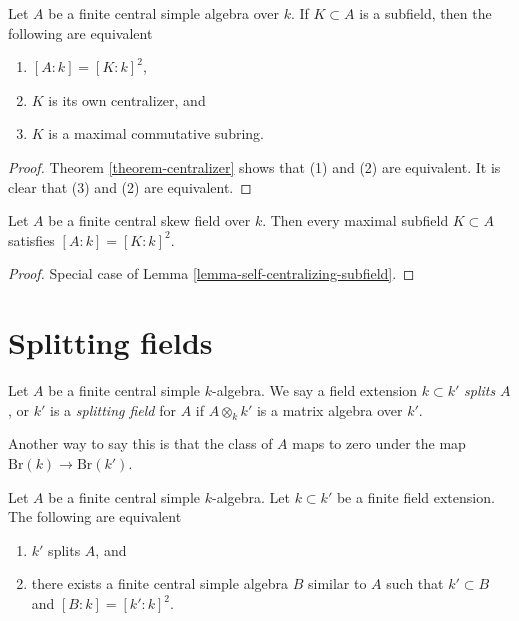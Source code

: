 \begin{lemma}
\label{lemma-self-centralizing-subfield}
Let $A$ be a finite central simple algebra over $k$.
If $K \subset A$ is a subfield, then the following are equivalent
\begin{enumerate}
\item $[A : k] = [K : k]^2$,
\item $K$ is its own centralizer, and
\item $K$ is a maximal commutative subring.
\end{enumerate}
\end{lemma}

\begin{proof}
Theorem \ref{theorem-centralizer}
shows that (1) and (2) are equivalent.
It is clear that (3) and (2) are equivalent.
\end{proof}

\begin{lemma}
\label{lemma-maximal-subfield}
Let $A$ be a finite central skew field over $k$.
Then every maximal subfield $K \subset A$ satisfies
$[A : k] = [K : k]^2$.
\end{lemma}

\begin{proof}
Special case of Lemma \ref{lemma-self-centralizing-subfield}.
\end{proof}





\section{Splitting fields}
\label{section-splitting}


\begin{definition}
\label{definition-splitting}
Let $A$ be a finite central simple $k$-algebra.
We say a field extension $k \subset k'$ {\it splits} $A$, or
$k'$ is a {\it splitting field} for $A$ if $A \otimes_k k'$ is
a matrix algebra over $k'$.
\end{definition}

\noindent
Another way to say this is that the class of $A$ maps to zero
under the map $\text{Br}(k) \to \text{Br}(k')$.

\begin{theorem}
\label{theorem-splitting}
Let $A$ be a finite central simple $k$-algebra.
Let $k \subset k'$ be a finite field extension.
The following are equivalent
\begin{enumerate}
\item $k'$ splits $A$, and
\item there exists a finite central simple algebra $B$ similar to $A$
such that $k' \subset B$ and $[B : k] = [k' : k]^2$.
\end{enumerate}
\end{theorem}

